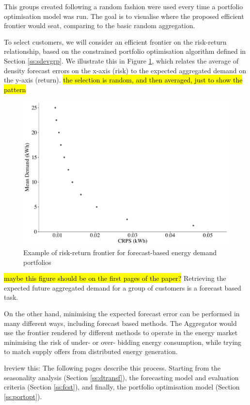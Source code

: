\documentclass[preprint,3p,12pt,authoryear]{elsarticle}
\begin{document}
This groups created following a random fashion were used every time a portfolio optimisation model was run.
The goal is to visualise where the proposed efficient frontier would seat, comparing to the basic random aggregation.

To select customers, we will consider an efficient frontier on the risk-return relationship, based on the constrained portfolio optimisation algorithm defined in Section \ref{ss:sdevgrp}. We illustrate this in Figure \ref{fig:portoptex}, which relates the average of density forecast errors on the x-axis (risk) to the expected aggregated demand on the y-axis (return). \hl{the selection is random, and then averaged, just to show the pattern}

\begin{figure}
  \centering
  \includegraphics[width=0.8\columnwidth]{2017-11-15_randomgrouping}
  \caption{Example of risk-return frontier for forecast-based energy demand portfolios}
  \label{fig:portoptex}
\end{figure}
\hl{maybe this figure should be on the first pages of the paper?}
Retrieving the expected future aggregated demand for a group of customers is a forecast based task.

On the other hand, minimising the expected forecast error can be performed in many different ways, including forecast based methods.
The Aggregator would use the frontier rendered by different methods to operate in the energy market minimising the risk of under- or over- bidding energy consumption, while trying to match supply offers from distributed energy generation.

\l{review this:} The following pages describe this process. Starting from the seasonality analysis (Section \ref{ss:dtransf}), the forecasting model and evaluation criteria (Section \ref{ss:fcst}), and finally, the portfolio optimisation model (Section \ref{ss:portopt}).
\end{document}
